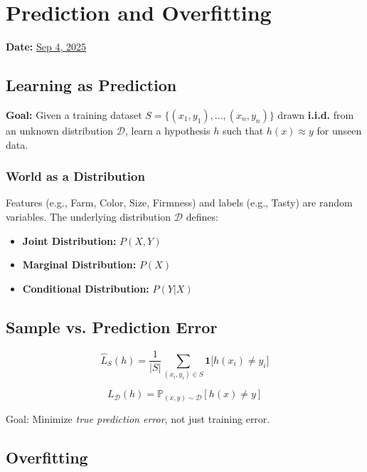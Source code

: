 \section{Prediction and Overfitting}
\textbf{Date:} \underline{Sep 4, 2025}

\subsection*{Learning as Prediction}

\textbf{Goal:}  
Given a training dataset $S = \{(x_1, y_1), \dots, (x_n, y_n)\}$ drawn \textbf{i.i.d.} from an unknown distribution $\mathcal{D}$,  
learn a hypothesis $h$ such that $h(x) \approx y$ for unseen data.

\subsubsection*{World as a Distribution}
Features (e.g., Farm, Color, Size, Firmness) and labels (e.g., Tasty) are random variables. The underlying distribution $\mathcal{D}$ defines:
    \begin{itemize}
        \item \textbf{Joint Distribution:} $P(X, Y)$
        \item \textbf{Marginal Distribution:} $P(X)$
        \item \textbf{Conditional Distribution:} $P(Y|X)$
    \end{itemize}

\subsection*{Sample vs. Prediction Error}

\begin{definition}
\[
\hat{L}_S(h) = \frac{1}{|S|} \sum_{(x_i,y_i)\in S} \mathbf{1}\big[h(x_i) \neq y_i\big]
\]
\end{definition}

\begin{definition}
\[
L_{\mathcal{D}}(h) = \mathbb{P}_{(x,y)\sim\mathcal{D}}[h(x) \neq y]
\]
\end{definition}

Goal: Minimize \emph{true prediction error}, not just training error.

\subsection*{Overfitting}

